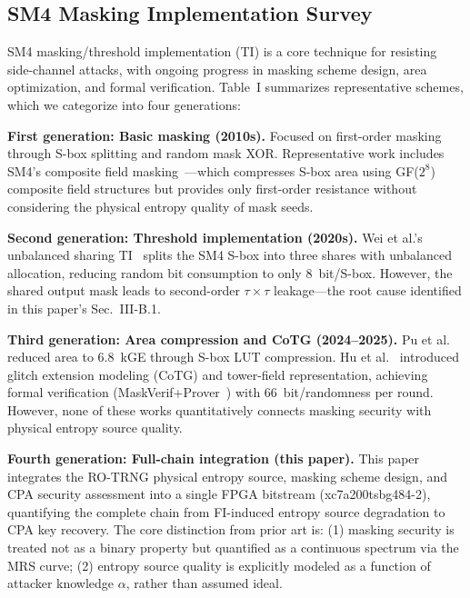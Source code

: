 \documentclass[journal]{IEEEtran}
\begin{document}
\subsection{SM4 Masking Implementation Survey}

SM4 masking/threshold implementation (TI) is a core technique for resisting side-channel attacks, with ongoing progress in masking scheme design, area optimization, and formal verification. Table~I summarizes representative schemes, which we categorize into four generations:

\textbf{First generation: Basic masking (2010s).} Focused on first-order masking through S-box splitting and random mask XOR. Representative work includes SM4's composite field masking~\cite{li2024composite}---which compresses S-box area using GF($2^8$) composite field structures but provides only first-order resistance without considering the physical entropy quality of mask seeds.

\textbf{Second generation: Threshold implementation (2020s).} Wei et al.'s unbalanced sharing TI~\cite{wei2024unbalanced} splits the SM4 S-box into three shares with unbalanced allocation, reducing random bit consumption to only 8~bit/S-box. However, the shared output mask leads to second-order $\tau\times\tau$ leakage---the root cause identified in this paper's Sec.~III-B.1.

\textbf{Third generation: Area compression and CoTG (2024--2025).} Pu et al.~\cite{pu2025area} reduced area to 6.8~kGE through S-box LUT compression. Hu et al.~\cite{hu2025second} introduced glitch extension modeling (CoTG) and tower-field representation, achieving formal verification (MaskVerif+Prover~\cite{hu2025maskverif}) with 66~bit/randomness per round. However, none of these works quantitatively connects masking security with physical entropy source quality.

\textbf{Fourth generation: Full-chain integration (this paper).} This paper integrates the RO-TRNG physical entropy source, masking scheme design, and CPA security assessment into a single FPGA bitstream (xc7a200tsbg484-2), quantifying the complete chain from FI-induced entropy source degradation to CPA key recovery. The core distinction from prior art is: (1) masking security is treated not as a binary property but quantified as a continuous spectrum via the MRS curve; (2) entropy source quality is explicitly modeled as a function of attacker knowledge $\alpha$, rather than assumed ideal.
\end{document}

